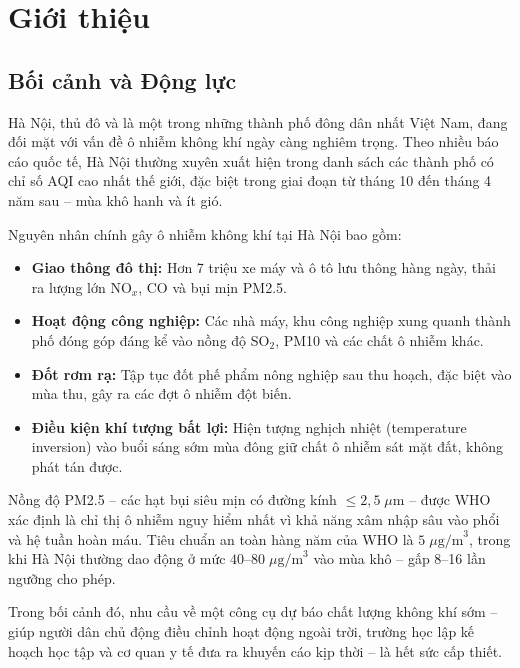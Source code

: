 \documentclass[12pt,a4paper]{report}
\begin{document}
\tableofcontents
\newpage
\listoffigures
\listoftables

\chapter{Giới thiệu}

\section{Bối cảnh và Động lực}

Hà Nội, thủ đô và là một trong những thành phố đông dân nhất Việt Nam, đang đối mặt với vấn đề ô nhiễm không khí ngày càng nghiêm trọng. Theo nhiều báo cáo quốc tế, Hà Nội thường xuyên xuất hiện trong danh sách các thành phố có chỉ số AQI cao nhất thế giới, đặc biệt trong giai đoạn từ tháng 10 đến tháng 4 năm sau -- mùa khô hanh và ít gió.

Nguyên nhân chính gây ô nhiễm không khí tại Hà Nội bao gồm:
\begin{itemize}
  \item \textbf{Giao thông đô thị:} Hơn 7 triệu xe máy và ô tô lưu thông hàng ngày, thải ra lượng lớn NO$_x$, CO và bụi mịn PM2.5.
  \item \textbf{Hoạt động công nghiệp:} Các nhà máy, khu công nghiệp xung quanh thành phố đóng góp đáng kể vào nồng độ SO$_2$, PM10 và các chất ô nhiễm khác.
  \item \textbf{Đốt rơm rạ:} Tập tục đốt phế phẩm nông nghiệp sau thu hoạch, đặc biệt vào mùa thu, gây ra các đợt ô nhiễm đột biến.
  \item \textbf{Điều kiện khí tượng bất lợi:} Hiện tượng nghịch nhiệt (temperature inversion) vào buổi sáng sớm mùa đông giữ chất ô nhiễm sát mặt đất, không phát tán được.
\end{itemize}

Nồng độ PM2.5 -- các hạt bụi siêu mịn có đường kính $\leq 2{,}5\;\mu\text{m}$ -- được WHO xác định là chỉ thị ô nhiễm nguy hiểm nhất vì khả năng xâm nhập sâu vào phổi và hệ tuần hoàn máu. Tiêu chuẩn an toàn hàng năm của WHO là $5\;\mu\text{g/m}^3$, trong khi Hà Nội thường dao động ở mức $40$--$80\;\mu\text{g/m}^3$ vào mùa khô -- gấp 8--16 lần ngưỡng cho phép.

Trong bối cảnh đó, nhu cầu về một công cụ dự báo chất lượng không khí sớm -- giúp người dân chủ động điều chỉnh hoạt động ngoài trời, trường học lập kế hoạch học tập và cơ quan y tế đưa ra khuyến cáo kịp thời -- là hết sức cấp thiết.
\end{document}
